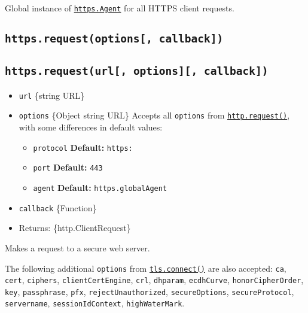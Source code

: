 Global instance of \hyperref[class-httpsagent]{\texttt{https.Agent}} for
all HTTPS client requests.

\subsection{\texorpdfstring{\texttt{https.request(options{[},\ callback{]})}}{https.request(options{[}, callback{]})}}\label{https.requestoptions-callback}

\subsection{\texorpdfstring{\texttt{https.request(url{[},\ options{]}{[},\ callback{]})}}{https.request(url{[}, options{]}{[}, callback{]})}}\label{https.requesturl-options-callback}

\begin{itemize}
\tightlist
\item
  \texttt{url} \{string \textbar{} URL\}
\item
  \texttt{options} \{Object \textbar{} string \textbar{} URL\} Accepts
  all \texttt{options} from
  \href{http.md\#httprequestoptions-callback}{\texttt{http.request()}},
  with some differences in default values:

  \begin{itemize}
  \tightlist
  \item
    \texttt{protocol} \textbf{Default:}
    \texttt{\textquotesingle{}https:\textquotesingle{}}
  \item
    \texttt{port} \textbf{Default:} \texttt{443}
  \item
    \texttt{agent} \textbf{Default:} \texttt{https.globalAgent}
  \end{itemize}
\item
  \texttt{callback} \{Function\}
\item
  Returns: \{http.ClientRequest\}
\end{itemize}

Makes a request to a secure web server.

The following additional \texttt{options} from
\href{tls.md\#tlsconnectoptions-callback}{\texttt{tls.connect()}} are
also accepted: \texttt{ca}, \texttt{cert}, \texttt{ciphers},
\texttt{clientCertEngine}, \texttt{crl}, \texttt{dhparam},
\texttt{ecdhCurve}, \texttt{honorCipherOrder}, \texttt{key},
\texttt{passphrase}, \texttt{pfx}, \texttt{rejectUnauthorized},
\texttt{secureOptions}, \texttt{secureProtocol}, \texttt{servername},
\texttt{sessionIdContext}, \texttt{highWaterMark}.

